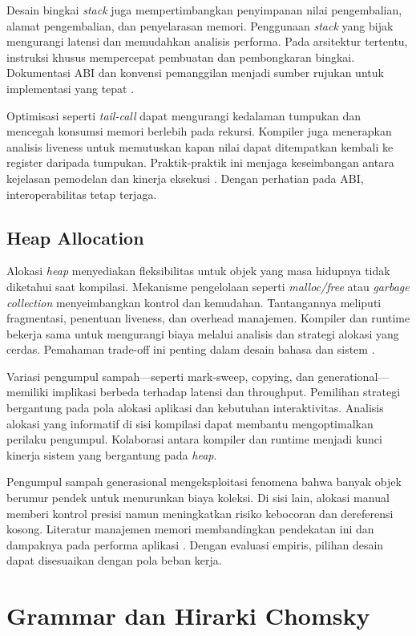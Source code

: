 \documentclass[../main.tex]{subfiles}
\begin{document}
Desain bingkai \emph{stack} juga mempertimbangkan penyimpanan nilai pengembalian, alamat pengembalian, dan penyelarasan memori. Penggunaan \emph{stack} yang bijak mengurangi latensi dan memudahkan analisis performa. Pada arsitektur tertentu, instruksi khusus mempercepat pembuatan dan pembongkaran bingkai. Dokumentasi ABI dan konvensi pemanggilan menjadi sumber rujukan untuk implementasi yang tepat \citep{WikiCallStack}.

Optimisasi seperti \emph{tail-call} dapat mengurangi kedalaman tumpukan dan mencegah konsumsi memori berlebih pada rekursi. Kompiler juga menerapkan analisis liveness untuk memutuskan kapan nilai dapat ditempatkan kembali ke register daripada tumpukan. Praktik-praktik ini menjaga keseimbangan antara kejelasan pemodelan dan kinerja eksekusi \citep{WikiCallStack}. Dengan perhatian pada ABI, interoperabilitas tetap terjaga.

\subsection{Heap Allocation}
Alokasi \emph{heap} menyediakan fleksibilitas untuk objek yang masa hidupnya tidak diketahui saat kompilasi. Mekanisme pengelolaan seperti \emph{malloc/free} atau \emph{garbage collection} menyeimbangkan kontrol dan kemudahan. Tantangannya meliputi fragmentasi, penentuan liveness, dan overhead manajemen. Kompiler dan runtime bekerja sama untuk mengurangi biaya melalui analisis dan strategi alokasi yang cerdas. Pemahaman trade-off ini penting dalam desain bahasa dan sistem \citep{WikiMemory}.

Variasi pengumpul sampah—seperti mark-sweep, copying, dan generational—memiliki implikasi berbeda terhadap latensi dan throughput. Pemilihan strategi bergantung pada pola alokasi aplikasi dan kebutuhan interaktivitas. Analisis alokasi yang informatif di sisi kompilasi dapat membantu mengoptimalkan perilaku pengumpul. Kolaborasi antara kompiler dan runtime menjadi kunci kinerja sistem yang bergantung pada \emph{heap}.

Pengumpul sampah generasional mengeksploitasi fenomena bahwa banyak objek berumur pendek untuk menurunkan biaya koleksi. Di sisi lain, alokasi manual memberi kontrol presisi namun meningkatkan risiko kebocoran dan dereferensi kosong. Literatur manajemen memori membandingkan pendekatan ini dan dampaknya pada performa aplikasi \citep{WikiMemory}. Dengan evaluasi empiris, pilihan desain dapat disesuaikan dengan pola beban kerja.

\section{Grammar dan Hirarki Chomsky}
\end{document}
